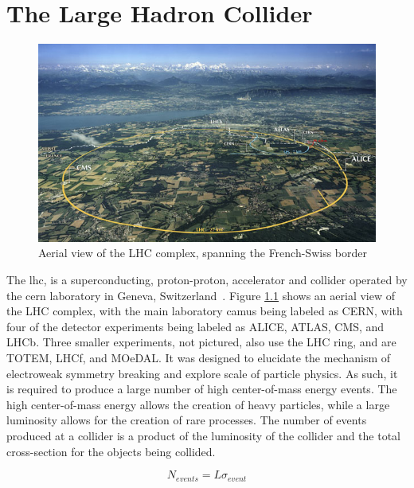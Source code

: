 \chapter{The Large Hadron Collider}
\label{lhc_overview}

\begin{figure}[h]
   \centering
  \includegraphics[width=1.0\textwidth]{Figures/LHC_Diagrams/LHC_Aerial_View.jpg}
  \caption{Aerial view of the LHC complex, spanning the French-Swiss border~\cite{LHC:Aerial_View}} \label{fig:lhc_aerial_with_labels}
\end{figure}

\par The \acrfull{lhc}, is a superconducting, proton-proton,
accelerator and collider operated by the \acrfull{cern} laboratory in
Geneva, Switzerland~\cite{lhc:machine_description}.  Figure
\ref{fig:lhc_aerial_with_labels} shows an aerial view of the LHC
complex, with the main laboratory camus being labeled as CERN, with
four of the detector experiments being labeled as ALICE, ATLAS, CMS,
and LHCb.  Three smaller experiments, not pictured, also use the LHC
ring, and are TOTEM, LHCf, and MOeDAL.  It was designed to elucidate
the mechanism of electroweak symmetry breaking and explore \TeV scale
of particle physics.  As such, it is required to produce a large
number of high center-of-mass energy events.  The high center-of-mass
energy allows the creation of heavy particles, while a large
luminosity allows for the creation of rare processes.  The number of events
produced at a collider is a product of the luminosity of the collider
and the total cross-section for the objects being collided.  

\begin{equation}\label{eq:Nevents}
N_{events} = L\sigma_{event}
\end{equation}

